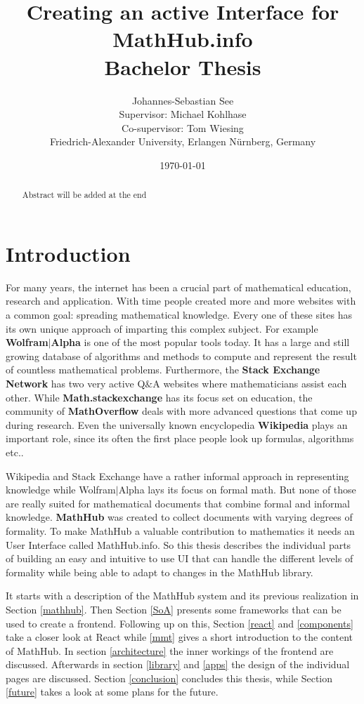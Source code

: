 \documentclass[11pt,a4paper]{article}
\title{Creating an active Interface for MathHub.info\\ \vspace{2 mm} Bachelor Thesis}
\author{Johannes-Sebastian See\\Supervisor: Michael Kohlhase\\Co-supervisor: Tom Wiesing\\Friedrich-Alexander University, Erlangen Nürnberg, Germany}
\date{\today}
\begin{document}
\begin{titlepage}
\maketitle
\begin{abstract}
Abstract will be added at the end
\end{abstract}

\end{titlepage}

\tableofcontents
\pagebreak
\section{Introduction}
For many years, the internet has been a crucial part of mathematical education, research and application. 
With time people created more and more websites with a common goal: spreading mathematical knowledge.
Every one of these sites has its own unique approach of imparting this complex subject.
For example \textbf{Wolfram$|$Alpha} \cite{wolfram} is one of the most popular tools today.
It has a large and still growing database of algorithms and methods to compute and represent the result of countless mathematical problems.
Furthermore, the \textbf{Stack Exchange Network} has two very active Q$\&$A websites where mathematicians assist each other.
While \textbf{Math.stackexchange} has its focus set on education, the community of \textbf{MathOverflow} deals with more advanced questions that come up during research.
Even the universally known encyclopedia \textbf{Wikipedia} plays an important role, since its often the first place people look up formulas, algorithms etc..

Wikipedia and Stack Exchange have a rather informal approach in representing knowledge while Wolfram$|$Alpha lays its focus on formal math.
But none of those are really suited for mathematical documents that combine formal and informal knowledge.
\textbf{MathHub}\cite{MathHub} was created to collect documents with varying degrees of formality.
To make MathHub a valuable contribution to mathematics it needs an User Interface called MathHub.info.
So this thesis describes the individual parts of building an easy and intuitive to use UI that can handle the different levels of formality while being able to adapt to changes in the MathHub library.

It starts with a description of the MathHub system and its previous realization in Section \ref{mathhub}.
Then Section \ref{SoA} presents some frameworks that can be used to create a frontend.
Following up on this, Section \ref{react} and \ref{components} take a closer look at React while \ref{mmt} gives a short introduction to the content of MathHub.
In section \ref{architecture} the inner workings of the frontend are discussed.
Afterwards in section \ref{library} and \ref{apps} the design of the individual pages are discussed.
Section \ref{conclusion} concludes this thesis, while Section \ref{future} takes a look at some plans for the future.
\end{document}
